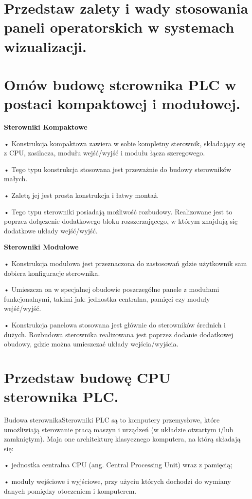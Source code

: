 \documentclass{article}
\begin{document}
	\section{ Przedstaw zalety i wady stosowania paneli operatorskich w systemach wizualizacji.}
	\section{ Omów budowę sterownika PLC w postaci kompaktowej i modułowej.}
	\textbf{Sterowniki  Kompaktowe}
	
	• Konstrukcja kompaktowa  zawiera w sobie kompletny sterownik, składający się z CPU, zasilacza, modułu wejść/wyjść i modułu łącza szeregowego.
	
	• Tego typu konstrukcja stosowana jest przeważnie do budowy sterowników małych.
	
	• Zaletą jej jest prosta konstrukcja i łatwy montaż.
	
	• Tego typu sterowniki posiadają możliwość rozbudowy. Realizowane jest to poprzez dołączenie dodatkowego bloku rozszerzającego, w którym znajdują się dodatkowe układy wejść/wyjść.
	
	\textbf{Sterowniki Modułowe}
	
	• Konstrukcja modułowa jest przeznaczona do zastosowań gdzie użytkownik sam dobiera konfiguracje sterownika.
	
	• Umieszcza on w specjalnej obudowie poszczególne panele z modułami funkcjonalnymi, takimi jak: jednostka centralna, pamięci czy moduły wejść/wyjść.
	
	• Konstrukcja panelowa stosowana jest głównie do sterowników średnich i dużych. Rozbudowa sterownika realizowana jest poprzez dodanie dodatkowej obudowy, gdzie można umieszczać układy wejścia/wyjścia.
	
	\section{ Przedstaw budowę CPU sterownika PLC.}
	
	Budowa sterownikaSterowniki PLC są to komputery przemysłowe, które umożliwiają sterowanie pracą maszyn i urządzeń (w układzie otwartym i/lub zamkniętym). Maja one architekturę klasycznego komputera, na którą składają się:
	
	• jednostka centralna CPU (ang. Central Processing Unit) wraz z pamięcią;
	
	• moduły wejściowe i wyjściowe, przy użyciu których dochodzi do wymiany danych pomiędzy otoczeniem i komputerem.
	
\end{document}
